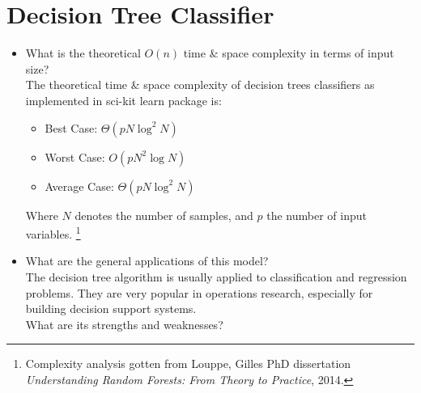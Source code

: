 \documentclass[twoside,openright,titlepage,numbers=noenddot,headinclude,%
               footinclude=true,cleardoublepage=empty,abstractoff,BCOR=5mm,%
               paper=a4,fontsize=11pt,ngerman,american]{scrreprt}
\numberwithin{theorem}{chapter}
\numberwithin{definition}{chapter}
\numberwithin{algorithm}{chapter}
\numberwithin{figure}{chapter}
\numberwithin{table}{chapter}
\numberwithin{equation}{chapter}
\begin{document}
\section*{Decision Tree Classifier}
\begin{itemize} 
\item What is the theoretical $O(n)$ time \& space complexity in terms of input size?\\ 
The theoretical time \& space complexity of decision trees classifiers as implemented in sci-kit learn package is:
\begin{itemize} 
\item Best Case: $\Theta(pN\log^2 N)$ 
\item Worst Case: $O(pN^2\log N)$
\item Average Case: $\Theta(pN\log^2 N)$
\end{itemize}
Where $N$ denotes the number of samples, and $p$ the number of input variables. \footnote{Complexity analysis gotten from Louppe, Gilles PhD dissertation \textit{Understanding Random Forests: From Theory to Practice}, 2014.}

\item What are the general applications of this model?\\
The decision tree algorithm is usually applied to classification and regression problems. They are very popular in operations research, especially for building decision support systems. \\
What are its strengths and weaknesses?\\  


\end{itemize}
\end{document}
